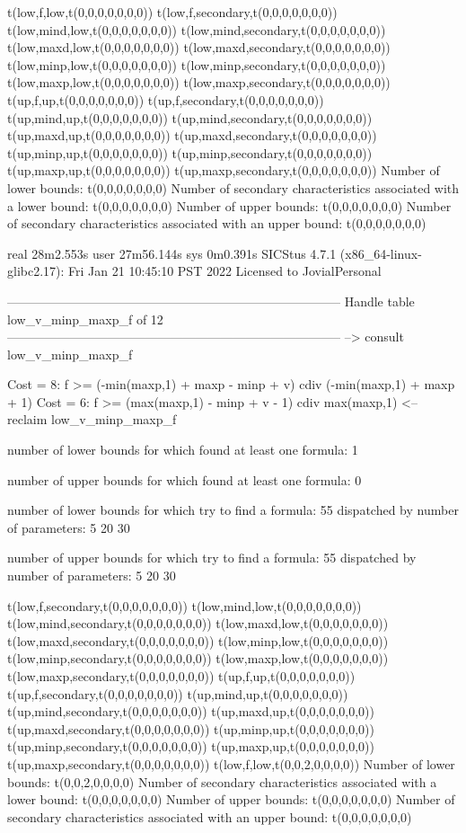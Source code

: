 t(low,f,low,t(0,0,0,0,0,0,0))
t(low,f,secondary,t(0,0,0,0,0,0,0))
t(low,mind,low,t(0,0,0,0,0,0,0))
t(low,mind,secondary,t(0,0,0,0,0,0,0))
t(low,maxd,low,t(0,0,0,0,0,0,0))
t(low,maxd,secondary,t(0,0,0,0,0,0,0))
t(low,minp,low,t(0,0,0,0,0,0,0))
t(low,minp,secondary,t(0,0,0,0,0,0,0))
t(low,maxp,low,t(0,0,0,0,0,0,0))
t(low,maxp,secondary,t(0,0,0,0,0,0,0))
t(up,f,up,t(0,0,0,0,0,0,0))
t(up,f,secondary,t(0,0,0,0,0,0,0))
t(up,mind,up,t(0,0,0,0,0,0,0))
t(up,mind,secondary,t(0,0,0,0,0,0,0))
t(up,maxd,up,t(0,0,0,0,0,0,0))
t(up,maxd,secondary,t(0,0,0,0,0,0,0))
t(up,minp,up,t(0,0,0,0,0,0,0))
t(up,minp,secondary,t(0,0,0,0,0,0,0))
t(up,maxp,up,t(0,0,0,0,0,0,0))
t(up,maxp,secondary,t(0,0,0,0,0,0,0))
Number of lower bounds:                                             t(0,0,0,0,0,0,0)
Number of secondary characteristics associated with a lower bound:  t(0,0,0,0,0,0,0)
Number of upper bounds:                                             t(0,0,0,0,0,0,0)
Number of secondary characteristics associated with an upper bound: t(0,0,0,0,0,0,0)

real	28m2.553s
user	27m56.144s
sys	0m0.391s
SICStus 4.7.1 (x86_64-linux-glibc2.17): Fri Jan 21 10:45:10 PST 2022
Licensed to JovialPersonal


--------------------------------------------------------------------------------
Handle table low_v_minp_maxp_f of 12
--------------------------------------------------------------------------------
--> consult low_v_minp_maxp_f

Cost =  8:  f >= (-min(maxp,1) + maxp - minp + v) cdiv (-min(maxp,1) + maxp + 1)
Cost =  6:  f >= (max(maxp,1) - minp + v - 1) cdiv max(maxp,1)
<-- reclaim low_v_minp_maxp_f

number of lower bounds for which found at least one formula: 1

number of upper bounds for which found at least one formula: 0

number of lower bounds for which try to find a formula: 55
dispatched by number of parameters: 5  20  30

number of upper bounds for which try to find a formula: 55
dispatched by number of parameters: 5  20  30

t(low,f,secondary,t(0,0,0,0,0,0,0))
t(low,mind,low,t(0,0,0,0,0,0,0))
t(low,mind,secondary,t(0,0,0,0,0,0,0))
t(low,maxd,low,t(0,0,0,0,0,0,0))
t(low,maxd,secondary,t(0,0,0,0,0,0,0))
t(low,minp,low,t(0,0,0,0,0,0,0))
t(low,minp,secondary,t(0,0,0,0,0,0,0))
t(low,maxp,low,t(0,0,0,0,0,0,0))
t(low,maxp,secondary,t(0,0,0,0,0,0,0))
t(up,f,up,t(0,0,0,0,0,0,0))
t(up,f,secondary,t(0,0,0,0,0,0,0))
t(up,mind,up,t(0,0,0,0,0,0,0))
t(up,mind,secondary,t(0,0,0,0,0,0,0))
t(up,maxd,up,t(0,0,0,0,0,0,0))
t(up,maxd,secondary,t(0,0,0,0,0,0,0))
t(up,minp,up,t(0,0,0,0,0,0,0))
t(up,minp,secondary,t(0,0,0,0,0,0,0))
t(up,maxp,up,t(0,0,0,0,0,0,0))
t(up,maxp,secondary,t(0,0,0,0,0,0,0))
t(low,f,low,t(0,0,2,0,0,0,0))
Number of lower bounds:                                             t(0,0,2,0,0,0,0)
Number of secondary characteristics associated with a lower bound:  t(0,0,0,0,0,0,0)
Number of upper bounds:                                             t(0,0,0,0,0,0,0)
Number of secondary characteristics associated with an upper bound: t(0,0,0,0,0,0,0)


